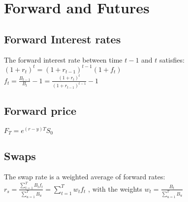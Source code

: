 \section{Forward and Futures}


\subsection*{Forward Interest rates}
The forward interest rate between time $t-1$ and $t$ satisfies:\\
$ (1+r_t)^t = (1+r_{t-1})^{t-1}(1+f_t) $ \\
$ f_t = \frac{B_{t-1}}{B_t} -1 =\frac{(1+r_t)^t}{(1+r_{t-1})^{t-1}} -1 $


\subsection*{Forward price}
$F_T=e^{(r-y)T} S_0$


\subsection*{Swaps}
The swap rate is a weighted average of forward rates: \\
$r_s = \frac{\sum_{t=1}^{T}B_t f_t}{\sum_{u=1}^{T}B_u} = \sum_{t=1}^{T} w_t  f_t$ , 
with the weights $w_t = \frac{B_t}{\sum_{u=1}^{T} B_u}$ \\